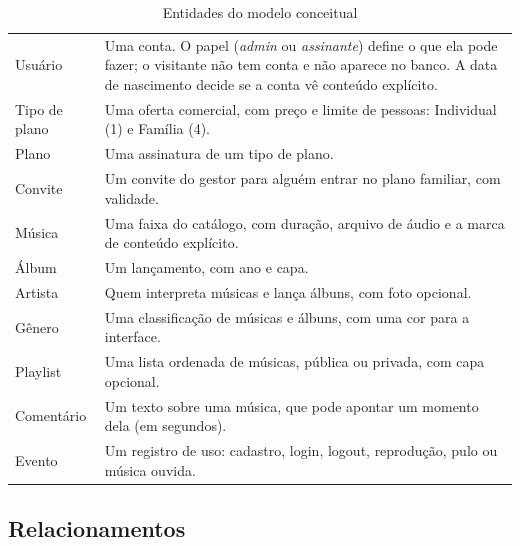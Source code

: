 \begin{table}[htbp]
  \centering
  \caption{Entidades do modelo conceitual}
  \label{tab:entidades}
  \begin{tabularx}{\textwidth}{@{}L{0.55}L{1.45}@{}}
    \toprule
     &  \\
    \midrule
    Usuário & Uma conta. O papel (\emph{admin} ou \emph{assinante}) define o que ela pode fazer; o visitante não tem conta e não aparece no banco. A data de nascimento decide se a conta vê conteúdo explícito. \\
    Tipo de plano & Uma oferta comercial, com preço e limite de pessoas: Individual (1) e Família (4). \\
    Plano & Uma assinatura de um tipo de plano. \\
    Convite & Um convite do gestor para alguém entrar no plano familiar, com validade. \\
    Música & Uma faixa do catálogo, com duração, arquivo de áudio e a marca de conteúdo explícito. \\
    Álbum & Um lançamento, com ano e capa. \\
    Artista & Quem interpreta músicas e lança álbuns, com foto opcional. \\
    Gênero & Uma classificação de músicas e álbuns, com uma cor para a interface. \\
    Playlist & Uma lista ordenada de músicas, pública ou privada, com capa opcional. \\
    Comentário & Um texto sobre uma música, que pode apontar um momento dela (em segundos). \\
    Evento & Um registro de uso: cadastro, login, logout, reprodução, pulo ou música ouvida. \\
    \bottomrule
  \end{tabularx}
\end{table}

\FloatBarrier
\subsection{Relacionamentos}

